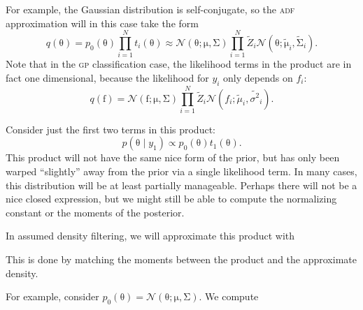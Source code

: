 \documentclass{article}
\newcommand{\acro}[1]{\textsc{\MakeLowercase{#1}}}
\newcommand{\given}{\mid}
\newcommand{\mc}[1]{\mathcal{#1}}
\newcommand{\mat}[1]{\bm{\mathrm{#1}}}
\renewcommand{\vec}[1]{\bm{\mathrm{#1}}}
\begin{document}
For example, the Gaussian distribution is self-conjugate, so the
\acro{ADF} approximation will in this case take the form
\[
  q(\vec{\theta})
  =
  p_0(\vec{\theta})
  \prod_{i=1}^N t_i(\vec{\theta})
  \approx
  \mc{N}(\vec{\theta}; \vec{\mu}, \mat{\Sigma})
  \prod_{i=1}^N
  \tilde{Z}_i
  \mc{N}(\vec{\theta}; \tilde{\vec{\mu}}_i, \tilde{\vec{\Sigma}}_i).
\]
Note that in the \acro{GP} classification case, the likelihood terms
in the product are in fact one dimensional, because the likelihood for
$y_i$ only depends on $f_i$:
\[
  q(\vec{f})
  =
  \mc{N}(\vec{f}; \vec{\mu}, \mat{\Sigma})
  \prod_{i=1}^N
  \tilde{Z}_i
  \mc{N}(f_i; \tilde{\mu}_i, \tilde{\sigma^2}_i).
\]

Consider just the first two terms in this product:
\[
  p(\vec{\theta} \given y_1)
  \propto
  p_0(\vec{\theta})
  t_1(\vec{\theta}).
\]
This product will not have the same nice form of the prior, but has
only been warped ``slightly'' away from the prior via a single
likelihood term.  In many cases, this distribution will be at least
partially manageable.  Perhaps there will not be a nice closed
expression, but we might still be able to compute the normalizing
constant or the moments of the posterior.

In assumed density filtering, we will approximate this product with


This is done by
matching the moments between the product and the approximate density.

For example, consider  $p_0(\vec{\theta}) = \mc{N}(\vec{\theta};
\vec{\mu}, \mat{\Sigma})$.  We compute
\begin{align*}

\end{align*}
\end{document}
